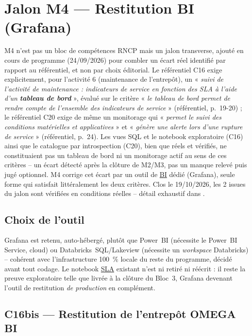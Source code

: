 \chapter{Jalon M4 --- Restitution BI (Grafana)}
\label{chap:m4}

M4 n'est pas un bloc de compétences RNCP mais un jalon transverse,
ajouté en cours de programme (24/09/2026) pour combler un écart réel
identifié par rapport au référentiel, et non par choix éditorial.
Le référentiel C16 exige explicitement, pour l'activité 6 (maintenance
de l'entrepôt), un « \textit{suivi de l'activité de maintenance :
indicateurs de service en fonction des SLA à l'aide d'un
\textbf{tableau de bord}} », évalué sur le critère « \textit{le tableau
de bord permet de rendre compte de l'ensemble des indicateurs de
service} » (référentiel, p.~19-20) ; le référentiel C20 exige de même
un monitorage qui « \textit{permet le suivi des conditions matérielles
et applicatives} » et « \textit{génère une alerte lors d'une rupture de
service} » (référentiel, p.~24). Les vues SQL et le notebook exploratoire
(C16) ainsi que le catalogue par introspection (C20), bien que réels et
vérifiés, ne constituaient pas un tableau de bord ni un monitorage
actif au sens de ces critères -- un écart détecté après la clôture de
M2/M3, pas un manque relevé puis jugé optionnel. M4 corrige cet écart
par un outil de \hyperref[gloss:bi]{BI} dédié (Grafana), seule forme
qui satisfait littéralement les deux critères. Clos le 19/10/2026, les 2 issues du
jalon sont vérifiées en conditions réelles -- détail exhaustif dans
.

\section{Choix de l'outil}

Grafana est retenu, auto-hébergé, plutôt que Power~BI (nécessite le
Power~BI Service, cloud) ou Databricks~SQL/Lakeview (nécessite un
\textit{workspace} Databricks) -- cohérent avec l'infrastructure 100~\%
locale du reste du programme, décidé avant tout codage. Le notebook
\hyperref[gloss:sla]{SLA} existant n'est ni retiré ni réécrit : il
reste la preuve exploratoire
telle que livrée à la clôture du Bloc~3, Grafana devenant l'outil de
restitution \textit{de production} en complément.

\section{C16bis --- Restitution de l'entrepôt OMEGA BI}


